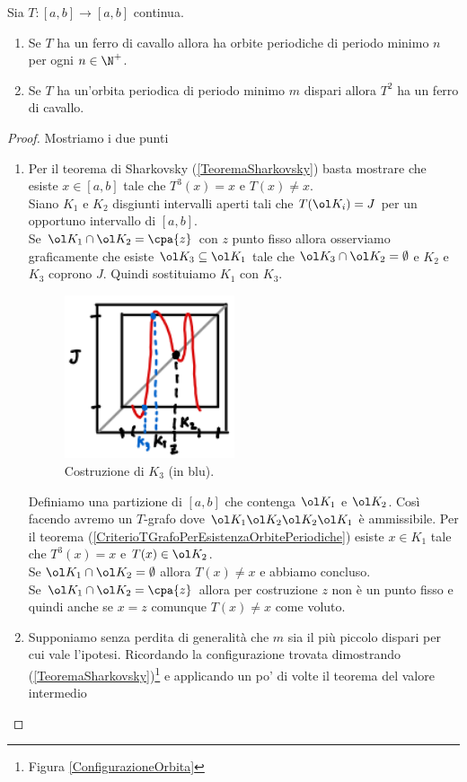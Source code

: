 \begin{proposition}\label{RelazioneFerroDiCavalloEPeriodiMinimi}
Sia $T:[a,b]\to[a,b]$ continua.
\begin{enumerate}
\item Se $T$ ha un ferro di cavallo allora ha orbite periodiche di periodo minimo $n$ per ogni $n\in\N^+$.
\item Se $T$ ha un'orbita periodica di periodo minimo $m$ dispari allora $T^2$ ha un ferro di cavallo. 
\end{enumerate}
\end{proposition}
\begin{proof}
Mostriamo i due punti
\setlength{\leftmargini}{0cm}
\begin{enumerate}
\item Per il teorema di Sharkovsky (\ref{TeoremaSharkovsky}) basta mostrare che esiste $x\in [a,b]$ tale che $T^3(x)=x$ e $T(x)\neq x$.\\ 
Siano $K_1$ e $K_2$ disgiunti intervalli aperti tali che $T(\ol K_i)=J$ per un opportuno intervallo di $[a,b]$.\\
Se $\ol K_1\cap \ol K_2=\cpa{z}$ con $z$ punto fisso allora osserviamo graficamente che esiste $\ol K_3\subseteq \ol K_1$ tale che $\ol K_3\cap \ol K_2=\emptyset$ e $K_2$ e $K_3$ coprono $J$. Quindi sostituiamo $K_1$ con $K_3$.

\begin{figure}[!htb]
	\centering
	\includegraphics[width=5cm]{Immagini/esempio_Dimostrazione_ferro_di_cavallo.png}
	\caption{Costruzione di $K_3$ (in blu).}
\end{figure}


Definiamo una partizione di $[a,b]$ che contenga $\ol K_1$ e $\ol K_2$. Cos\`i facendo avremo un $T$-grafo dove $\ol K_1\ol K_2\ol K_2\ol K_1$ \`e ammissibile. Per il teorema (\ref{CriterioTGrafoPerEsistenzaOrbitePeriodiche}) esiste $x\in K_1$ tale che $T^3(x)=x$ e $T(x)\in \ol K_2$.\\
Se $\ol K_1\cap \ol K_2=\emptyset$ allora $T(x)\neq x$ e abbiamo concluso.\\
Se $\ol K_1\cap \ol K_2=\cpa{z}$ allora per costruzione $z$ non \`e un punto fisso e quindi anche se $x=z$ comunque $T(x)\neq x$ come voluto.
\item Supponiamo senza perdita di generalit\`a che $m$ sia il pi\`u piccolo dispari per cui vale l'ipotesi. Ricordando la configurazione trovata dimostrando (\ref{TeoremaSharkovsky})\footnote{Figura \ref{ConfigurazioneOrbita}} e applicando un po' di volte il teorema del valore intermedio


\end{enumerate}
\end{proof}
